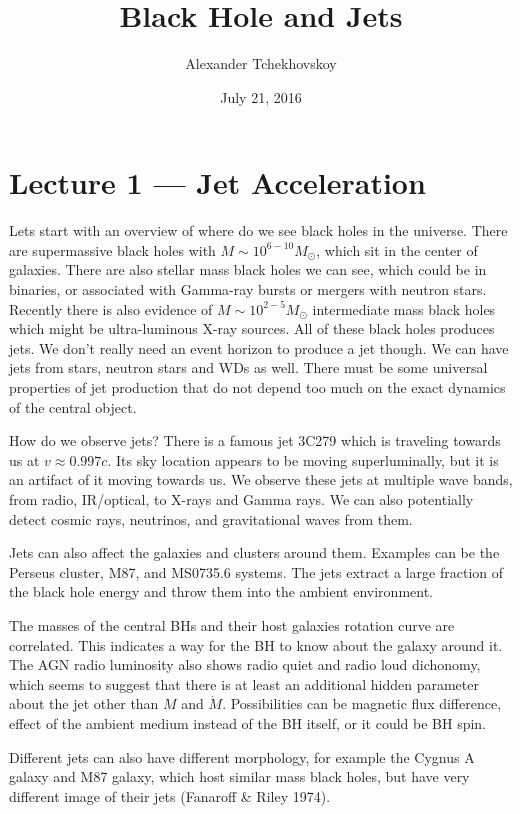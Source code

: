 \documentclass[letterpaper, 11pt]{article}
\numberwithin{equation}{section}
\numberwithin{figure}{section}
\begin{document}
\title{Black Hole and Jets}
\author{Alexander Tchekhovskoy}
\date{July 21, 2016}

\maketitle

\section{Lecture 1 --- Jet Acceleration}

Lets start with an overview of where do we see black holes in the universe.
There are supermassive black holes with $M\sim 10^{6-10}M_{\odot}$, which sit in
the center of galaxies. There are also stellar mass black holes we can see,
which could be in binaries, or associated with Gamma-ray bursts or mergers with
neutron stars. Recently there is also evidence of $M\sim 10^{2-5}M_{\odot}$
intermediate mass black holes which might be ultra-luminous X-ray sources. All
of these black holes produces jets. We don't really need an event horizon to
produce a jet though. We can have jets from stars, neutron stars and WDs as
well. There must be some universal properties of jet production that do not
depend too much on the exact dynamics of the central object.

How do we observe jets? There is a famous jet 3C279 which is traveling towards
us at $v\approx 0.997c$. Its sky location appears to be moving superluminally,
but it is an artifact of it moving towards us. We observe these jets at multiple
wave bands, from radio, IR/optical, to X-rays and Gamma rays. We can also
potentially detect cosmic rays, neutrinos, and gravitational waves from them.

Jets can also affect the galaxies and clusters around them. Examples can be the
Perseus cluster, M87, and MS0735.6 systems. The jets extract a large fraction of
the black hole energy and throw them into the ambient environment.

The masses of the central BHs and their host galaxies rotation curve are
correlated. This indicates a way for the BH to know about the galaxy around it.
The AGN radio luminosity also shows radio quiet and radio loud dichonomy, which
seems to suggest that there is at least an additional hidden parameter about the
jet other than $M$ and $\dot{M}$. Possibilities can be magnetic flux difference,
effect of the ambient medium instead of the BH itself, or it could be BH spin.

Different jets can also have different morphology, for example the Cygnus A
galaxy and M87 galaxy, which host similar mass black holes, but have very
different image of their jets (Fanaroff \& Riley 1974).
\end{document}

